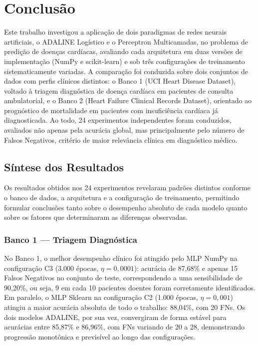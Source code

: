 \chapter{Conclusão}
\label{cap:conclusao}

Este trabalho investigou a aplicação de dois paradigmas de redes neurais artificiais, o ADALINE Logístico e o Perceptron Multicamadas, no problema de predição de doenças cardíacas, avaliando cada arquitetura em duas versões de implementação (NumPy e scikit-learn) e sob três configurações de treinamento sistematicamente variadas. A comparação foi conduzida sobre dois conjuntos de dados com perfis clínicos distintos: o Banco 1 (UCI Heart Disease Dataset), voltado à triagem diagnóstica de doença cardíaca em pacientes de consulta ambulatorial, e o Banco 2 (Heart Failure Clinical Records Dataset), orientado ao prognóstico de mortalidade em pacientes com insuficiência cardíaca já diagnosticada. Ao todo, 24 experimentos independentes foram conduzidos, avaliados não apenas pela acurácia global, mas principalmente pelo número de Falsos Negativos, critério de maior relevância clínica em diagnóstico médico.

\section{Síntese dos Resultados}

Os resultados obtidos nos 24 experimentos revelaram padrões distintos conforme o banco de dados, a arquitetura e a configuração de treinamento, permitindo formular conclusões tanto sobre o desempenho absoluto de cada modelo quanto sobre os fatores que determinaram as diferenças observadas.

\subsection{Banco 1 --- Triagem Diagnóstica}

No Banco 1, o melhor desempenho clínico foi atingido pelo MLP NumPy na configuração C3 (3.000 épocas, $\eta = 0{,}0001$): acurácia de 87,68\% e apenas 15 Falsos Negativos no conjunto de teste, correspondendo a uma sensibilidade de 90,20\%, ou seja, 9 em cada 10 pacientes doentes foram corretamente identificados. Em paralelo, o MLP Sklearn na configuração C2 (1.000 épocas, $\eta = 0{,}001$) atingiu a maior acurácia absoluta de todo o trabalho: 88,04\%, com 20 FNs. Os dois modelos ADALINE, por sua vez, convergiram de forma estável para acurácias entre 85,87\% e 86,96\%, com FNs variando de 20 a 28, demonstrando progressão monotônica e previsível ao longo das configurações.

